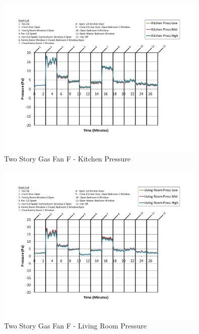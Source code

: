 \documentclass{article}
\begin{document}
\begin{appendices}
	\begin{figure}[H]
		\centering
		\includegraphics[height=3.05in,trim=0.67in 1.1in 0.67in 0.8in,clip=true]{0_Images/Results_Charts/ColdFlow/Two_Story/Gas/F/Kitchen_Pressure.pdf}
		\caption{Two Story Gas Fan F - Kitchen Pressure}
	\end{figure}
 

	\begin{figure}[H]
		\centering
		\includegraphics[height=3.05in,trim=0.67in 1.1in 0.67in 0.8in,clip=true]{0_Images/Results_Charts/ColdFlow/Two_Story/Gas/F/Living_Room_Pressure.pdf}
		\caption{Two Story Gas Fan F - Living Room Pressure}
	\end{figure}
 
	\clearpage


\end{appendices}
\end{document}
